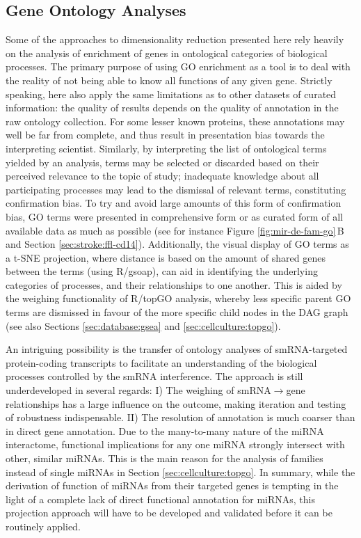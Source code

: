 \subsection{Gene Ontology Analyses} \label{sec:discussion:go}
Some of the approaches to dimensionality reduction presented here rely heavily on the analysis of enrichment of genes in ontological categories of biological processes. The primary purpose of using GO enrichment as a tool is to deal with the reality of not being able to know all functions of any given gene. Strictly speaking, here also apply the same limitations as to other datasets of curated information: the quality of results depends on the quality of annotation in the raw ontology collection. For some lesser known proteins, these annotations may well be far from complete, and thus result in presentation bias towards the interpreting scientist. Similarly, by interpreting the list of ontological terms yielded by an analysis, terms may be selected or discarded based on their perceived relevance to the topic of study; inadequate knowledge about all participating processes may lead to the dismissal of relevant terms, constituting confirmation bias. To try and avoid large amounts of this form of confirmation bias, GO terms were presented in comprehensive form or as curated form of all available data as much as possible (see for instance Figure \ref{fig:mir-de-fam-go}\,B and Section \ref{sec:stroke:ffl-cd14}). Additionally, the visual display of GO terms as a t-SNE projection, where distance is based on the amount of shared genes between the terms (using R/gsoap\cite{Tokar2020}), can aid in identifying the underlying categories of processes, and their relationships to one another. This is aided by the weighing functionality of R/topGO analysis,\cite{Alexa2006} whereby less specific parent GO terms are dismissed in favour of the more specific child nodes in the DAG graph (see also Sections \ref{sec:database:gsea} and \ref{sec:cellculture:topgo}).

An intriguing possibility is the transfer of ontology analyses of smRNA-targeted protein-coding transcripts to facilitate an understanding of the biological processes controlled by the smRNA interference. The approach is still underdeveloped in several regards: I) The weighing of smRNA$\to$gene relationships has a large influence on the outcome, making iteration and testing of robustness indispensable. II) The resolution of annotation is much coarser than in direct gene annotation. Due to the many-to-many nature of the miRNA interactome, functional implications for any one miRNA strongly intersect with other, similar miRNAs. This is the main reason for the analysis of families instead of single miRNAs in Section \ref{sec:cellculture:topgo}. In summary, while the derivation of function of miRNAs from their targeted genes is tempting in the light of a complete lack of direct functional annotation for miRNAs, this projection approach will have to be developed and validated before it can be routinely applied.


